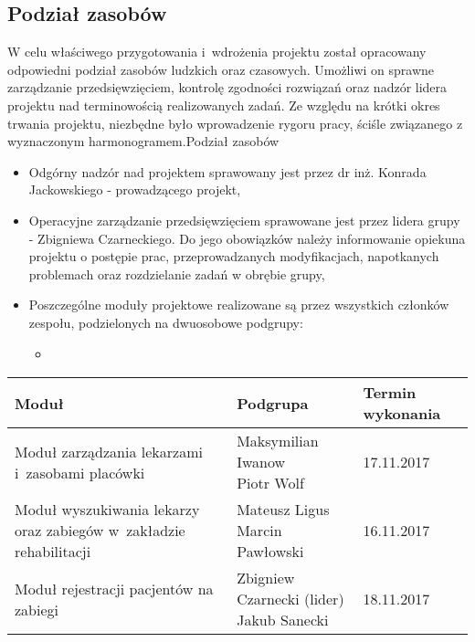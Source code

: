 \subsection{Podział zasobów}

W celu właściwego przygotowania i~wdrożenia projektu został opracowany odpowiedni podział zasobów ludzkich oraz czasowych. Umożliwi on sprawne zarządzanie przedsięwzięciem, kontrolę zgodności rozwiązań oraz nadzór lidera projektu nad terminowością realizowanych zadań. Ze względu na krótki okres trwania projektu, niezbędne było wprowadzenie rygoru pracy, ściśle związanego z wyznaczonym harmonogramem.Podział zasobów

\begin{itemize}
	\item Odgórny nadzór nad projektem sprawowany jest przez dr inż. Konrada Jackowskiego - prowadzącego projekt,
	\item Operacyjne zarządzanie przedsięwzięciem sprawowane jest przez lidera grupy - Zbigniewa Czarneckiego. Do jego obowiązków należy informowanie opiekuna projektu o postępie prac, przeprowadzanych modyfikacjach, napotkanych problemach oraz rozdzielanie zadań w obrębie grupy,
	\item Poszczególne moduły projektowe realizowane są przez wszystkich członków zespołu, podzielonych na dwuosobowe podgrupy:
	\begin{itemize}
		\item 
	\end{itemize}
\end{itemize}



\begin{tabular}{|p{7.7cm}|l|l|}
	\hline
	Moduł & Podgrupa & Termin wykonania \tabularnewline \hline
	Moduł zarządzania lekarzami i~zasobami placówki & \makecell[l]{Maksymilian Iwanow \\ Piotr Wolf} & 17.11.2017 \tabularnewline \hline
	Moduł wyszukiwania lekarzy oraz zabiegów w~zakładzie rehabilitacji & \makecell[l]{Mateusz Ligus \\ Marcin Pawłowski} & 16.11.2017 \tabularnewline \hline
	Moduł rejestracji pacjentów na zabiegi & \makecell[l]{Zbigniew Czarnecki (lider) \\ Jakub Sanecki} & 18.11.2017 \tabularnewline \hline
\end{tabular}
